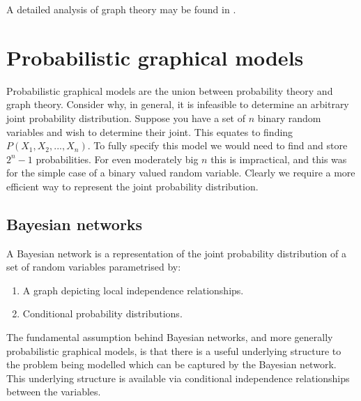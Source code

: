 A detailed analysis of graph theory may be found in \cite{deo}.
\section{Probabilistic graphical models}
\label{sec_graphical_models_theory}
Probabilistic graphical models are the union between probability theory and graph theory. Consider why, in general, it is infeasible to determine an arbitrary joint probability distribution. Suppose you have a set of $n$ binary random variables and wish to determine their joint. This equates to finding $P(X_1,X_2,...,X_n)$. To fully specify this model we would need to find and store $2^n-1$ probabilities. For even moderately big $n$ this is impractical, and this was for the simple case of a binary valued random variable. Clearly we require a more efficient way to represent the joint probability distribution.

\subsection{Bayesian networks}
A Bayesian network is a representation of the joint probability distribution of a set of random variables parametrised by:
\begin{enumerate}
\item
A graph depicting local independence relationships.
\item
Conditional probability distributions.
\end{enumerate}  
The fundamental assumption behind Bayesian networks, and more generally probabilistic graphical models, is that there is a useful underlying structure to the problem being modelled which can be captured by the Bayesian network. This underlying structure is available via conditional independence relationships between the variables.


